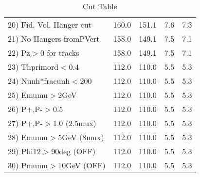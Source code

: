 \begin{table}[h!]
\begin{tabular}{||l||r|r|r|r||}
 20) Fid. Vol. Hanger cut &       160.0 &       151.1 &         7.6 &         7.3 \\
 21) No Hangers fromPVert &       158.0 &       149.1 &         7.5 &         7.1 \\
 22) Pz$>$0 for tracks    &       158.0 &       149.1 &         7.5 &         7.1 \\
 23) Thprimord$<$0.4      &       112.0 &       110.0 &         5.5 &         5.3 \\
 24) Nunh*fracunh$<$200   &       112.0 &       110.0 &         5.5 &         5.3 \\
 25) Emumu$>$2GeV         &       112.0 &       110.0 &         5.5 &         5.3 \\
 26) P+,P-$>$0.5          &       112.0 &       110.0 &         5.5 &         5.3 \\
 27) P+,P-$>$1.0 (2.5mux) &       112.0 &       110.0 &         5.5 &         5.3 \\
 28) Emumu$>$5GeV  (8mux) &       112.0 &       110.0 &         5.5 &         5.3 \\
 29) Phi12$>$90deg  (OFF) &       112.0 &       110.0 &         5.5 &         5.3 \\
 30) Pmumu$>$10GeV  (OFF) &       112.0 &       110.0 &         5.5 &         5.3 \\
 \hline
 \hline
 \end{tabular}
 \caption{Cut Table \cohrp  }
 \label{tab-cut_crhop}
 \end{table}
